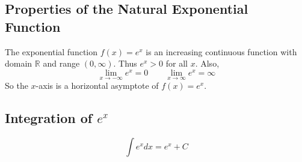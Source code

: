 \subsection*{Properties of the Natural Exponential Function}

The exponential function \( f(x)=e^x \) is an increasing continuous function with domain \( \mathbb{R} \) and range \( (0, \infty) \). Thus \( e^x > 0 \) for all \(x\). Also, 
\[ \lim_{x \to -\infty}{e^x} = 0 \quad \quad \lim_{x \to \infty}{e^x} = \infty \]
So the \(x\)-axis is a horizontal asymptote of \(f(x)=e^x\).

\subsection*{Integration of \(e^x\)}

\[ \int{e^x dx} = e^x + C \]
